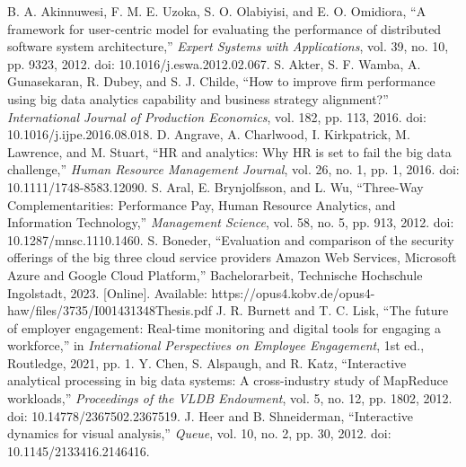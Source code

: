 \begin{thebibliography}{99}
 B. A. Akinnuwesi, F. M. E. Uzoka, S. O. Olabiyisi, and E. O. Omidiora, \textquotedblleft A framework for user-centric model for evaluating the performance of distributed software system architecture,\textquotedblright{} \emph{Expert Systems with Applications}, vol. 39, no. 10, pp. 9323, 2012. doi: 10.1016/j.eswa.2012.02.067.
 S. Akter, S. F. Wamba, A. Gunasekaran, R. Dubey, and S. J. Childe, \textquotedblleft How to improve firm performance using big data analytics capability and business strategy alignment?\textquotedblright{} \emph{International Journal of Production Economics}, vol. 182, pp. 113, 2016. doi: 10.1016/j.ijpe.2016.08.018.
 D. Angrave, A. Charlwood, I. Kirkpatrick, M. Lawrence, and M. Stuart, \textquotedblleft HR and analytics: Why HR is set to fail the big data challenge,\textquotedblright{} \emph{Human Resource Management Journal}, vol. 26, no. 1, pp. 1, 2016. doi: 10.1111/1748-8583.12090.
 S. Aral, E. Brynjolfsson, and L. Wu, \textquotedblleft Three-Way Complementarities: Performance Pay, Human Resource Analytics, and Information Technology,\textquotedblright{} \emph{Management Science}, vol. 58, no. 5, pp. 913, 2012. doi: 10.1287/mnsc.1110.1460.
 S. Boneder, \textquotedblleft Evaluation and comparison of the security offerings of the big three cloud service providers Amazon Web Services, Microsoft Azure and Google Cloud Platform,\textquotedblright{} Bachelorarbeit, Technische Hochschule Ingolstadt, 2023. [Online]. Available: https://opus4.kobv.de/opus4-haw/files/3735/I001431348Thesis.pdf
 J. R. Burnett and T. C. Lisk, \textquotedblleft The future of employer engagement: Real-time monitoring and digital tools for engaging a workforce,\textquotedblright{} in \emph{International Perspectives on Employee Engagement}, 1st ed., Routledge, 2021, pp. 1.
 Y. Chen, S. Alspaugh, and R. Katz, \textquotedblleft Interactive analytical processing in big data systems: A cross-industry study of MapReduce workloads,\textquotedblright{} \emph{Proceedings of the VLDB Endowment}, vol. 5, no. 12, pp. 1802, 2012. doi: 10.14778/2367502.2367519.
 J. Heer and B. Shneiderman, \textquotedblleft Interactive dynamics for visual analysis,\textquotedblright{} \emph{Queue}, vol. 10, no. 2, pp. 30, 2012. doi: 10.1145/2133416.2146416.

\end{thebibliography}
